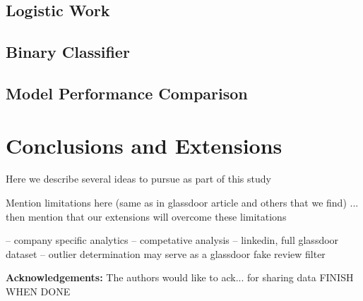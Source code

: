 \documentclass[10pt]{article}
\begin{document}
\subsection{Logistic Work}


\subsection{Binary Classifier}

\subsection{Model Performance Comparison}

\section{Conclusions and Extensions}


Here we describe several ideas to pursue as part of this study

Mention limitations here (same as in glassdoor article and others that we find) ... then 
mention that our extensions will overcome these limitations 

-- company specific analytics
-- competative analysis
-- linkedin, full glassdoor dataset 
-- outlier determination may serve as a glassdoor fake review filter 



\textbf{Acknowledgements:} The authors would like to ack... for sharing data FINISH WHEN DONE




\end{document}
